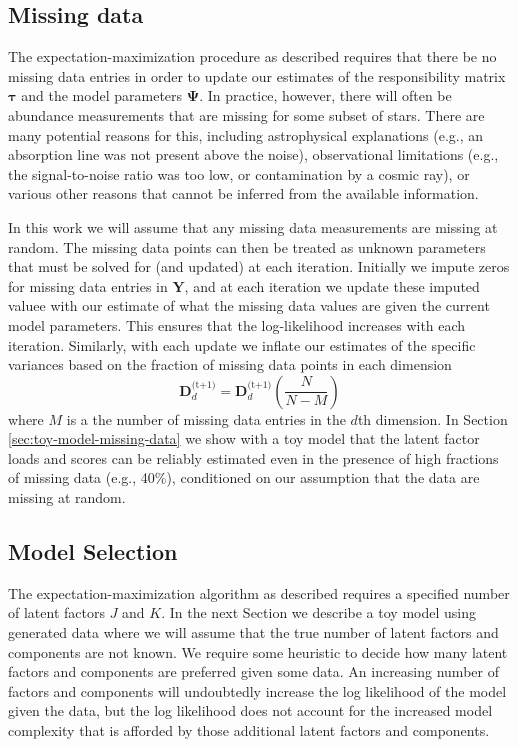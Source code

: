 \documentclass[twocolumn]{aastex62}
\newcommand{\vect}[1]{\boldsymbol{\mathbf{#1}}}
\renewcommand{\vec}[1]{\vect{#1}}
\newcommand{\data}{\textbf{Y}}
\newcommand{\nextstep}{^\textrm{(t+1)}}
\newcommand{\specificvariance}{\vec{D}}
\newcommand{\NumLatentFactors}{J}
\newcommand{\NumComponents}{K}
\begin{document}
\subsection{Missing data}

The expectation-maximization procedure as described requires that there be no 
missing data entries in order to update our estimates of the responsibility matrix $\vec\tau$
and the model parameters $\vec\Psi$.
In practice, however, there will often be abundance measurements that are missing
for some subset of stars. There are many potential reasons for this, including
astrophysical explanations (e.g., an absorption line was not present above the noise),
observational limitations (e.g., the signal-to-noise ratio was too low, or 
contamination by a cosmic ray), or various other reasons that cannot be inferred
from the available information.

In this work we will assume that any missing data measurements are
missing at random. The missing data points can then be treated as unknown
parameters that must be solved for (and updated) at each iteration. Initially
we impute zeros for missing data entries in $\vec\data$, and at each iteration we update
these imputed valuee with our estimate of what the missing data values
are given the current model parameters. This ensures that the log-likelihood increases
with each iteration. Similarly, with each update we inflate
our estimates of the specific variances based on the fraction of missing
data points in each dimension
\begin{equation}
\specificvariance_d\nextstep = \specificvariance_d\nextstep\left(\frac{N}{N-M}\right)
\end{equation}
\noindent{}where $M$ is a the number of missing data entries in the $d$th dimension.
In Section \ref{sec:toy-model-missing-data} we show with a toy model that the latent
factor loads and scores can be reliably estimated even in the presence of high fractions
of missing data (e.g., 40\%), conditioned on our assumption that the data are missing
at random.





\subsection{Model Selection}

The expectation-maximization algorithm as described requires a specified 
number of latent factors $\NumLatentFactors$ and $\NumComponents$. In the next 
Section we describe a toy model using generated data where we will assume
that the true number of latent factors and components are not known. 
We require some heuristic to decide how many latent factors and components are 
preferred given some data. An increasing number of factors
and components will undoubtedly increase the log likelihood of the model given
the data, but the log likelihood does not account for the increased model 
complexity that is afforded by those additional latent factors and components.
\end{document}
